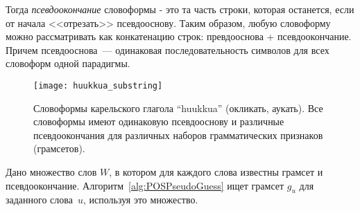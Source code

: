Тогда \emph{псевдоокончание} словоформы - это та часть строки, которая останется, если от начала <<отрезать>> псевдооснову.  
Таким образом, любую словоформу можно рассматривать как конкатенацию строк: превдооснова + псевдоокончание. 
Причем псевдооснова~--- одинаковая последовательность символов для всех словоформ одной парадигмы.

\begin{figure}
    \centering
    \texttt{[image: huukkua\_substring]}
    \caption[Словоформы карельского глагола ``huukkua'']{Словоформы карельского глагола ``huukkua'' (окликать, аукать). 
    Все словоформы имеют одинаковую псевдооснову и различные псевдоокончания 
    для различных наборов грамматических признаков (грамсетов).} 
    \label{fig:huukkua_substring}
\end{figure}

Дано множество слов $W$,  в котором для каждого слова известны грамсет и псевдоокончание. Алгоритм~\ref{alg:POSPseudoGuess} ищет грамсет $g_u$ для заданного слова~$u$, используя это множество.

